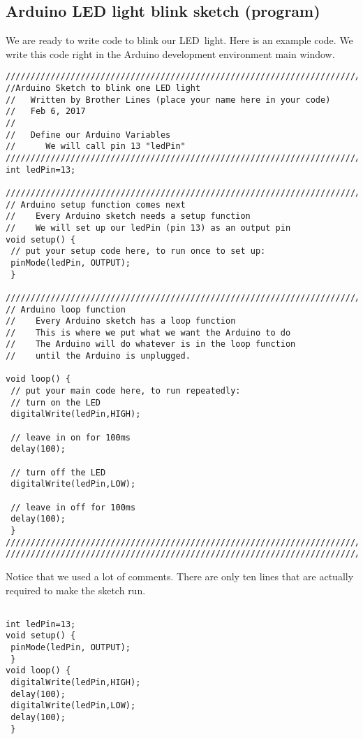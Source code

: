 \subsection{Arduino LED light blink sketch (program)}

We are ready to write code to blink our LED\ light. Here is an example code.
We write this code right in the Arduino development environment main window.
\begin{verbatim}
////////////////////////////////////////////////////////////////////////////
//Arduino Sketch to blink one LED light
//   Written by Brother Lines (place your name here in your code)
//   Feb 6, 2017
//
//   Define our Arduino Variables
//      We will call pin 13 "ledPin"
////////////////////////////////////////////////////////////////////////////
int ledPin=13;
 
////////////////////////////////////////////////////////////////////////////
// Arduino setup function comes next
//    Every Arduino sketch needs a setup function
//    We will set up our ledPin (pin 13) as an output pin
void setup() {
 // put your setup code here, to run once to set up:
 pinMode(ledPin, OUTPUT);
 }
 
////////////////////////////////////////////////////////////////////////////
// Arduino loop function
//    Every Arduino sketch has a loop function
//    This is where we put what we want the Arduino to do
//    The Arduino will do whatever is in the loop function 
//    until the Arduino is unplugged.
 
void loop() {
 // put your main code here, to run repeatedly:
 // turn on the LED
 digitalWrite(ledPin,HIGH);
 
 // leave in on for 100ms
 delay(100);
 
 // turn off the LED
 digitalWrite(ledPin,LOW);
 
 // leave in off for 100ms
 delay(100);
 }
////////////////////////////////////////////////////////////////////////////
////////////////////////////////////////////////////////////////////////////
\end{verbatim}

Notice that we used a lot of comments. There are only ten lines that are
actually required to make the sketch run.
\begin{verbatim}
 
int ledPin=13;
void setup() {
 pinMode(ledPin, OUTPUT);
 }
void loop() {
 digitalWrite(ledPin,HIGH);
 delay(100);
 digitalWrite(ledPin,LOW);
 delay(100);
 }
 
\end{verbatim}

